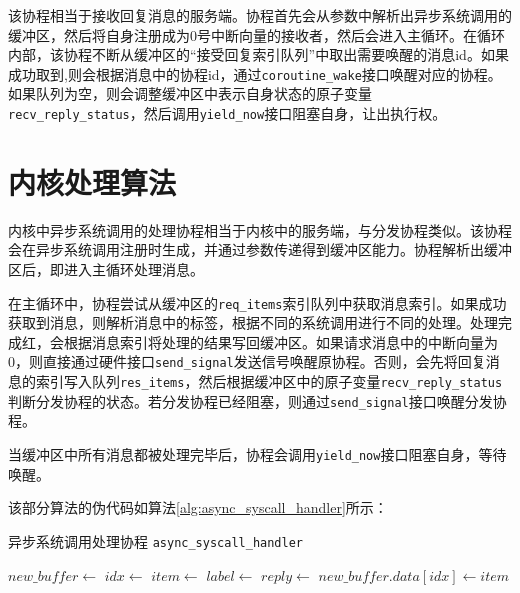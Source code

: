 该协程相当于接收回复消息的服务端。协程首先会从参数中解析出异步系统调用的缓冲区，然后将自身注册成为0号中断向量的接收者，然后会进入主循环。在循环内部，该协程不断从缓冲区的“接受回复索引队列”中取出需要唤醒的消息id。如果成功取到,则会根据消息中的协程id，通过\texttt{coroutine\_wake}接口唤醒对应的协程。如果队列为空，则会调整缓冲区中表示自身状态的原子变量
\texttt{recv\_reply\_status}，然后调用\texttt{yield\_now}接口阻塞自身，让出执行权。

\section{内核处理算法}

内核中异步系统调用的处理协程相当于内核中的服务端，与分发协程类似。该协程会在异步系统调用注册时生成，并通过参数传递得到缓冲区能力。协程解析出缓冲区后，即进入主循环处理消息。

在主循环中，协程尝试从缓冲区的\texttt{req\_items}索引队列中获取消息索引。如果成功获取到消息，则解析消息中的标签，根据不同的系统调用进行不同的处理。处理完成红，会根据消息索引将处理的结果写回缓冲区。如果请求消息中的中断向量为0，则直接通过硬件接口\texttt{send\_signal}发送信号唤醒原协程。否则，会先将回复消息的索引写入队列\texttt{res\_items}，然后根据缓冲区中的原子变量\texttt{recv\_reply\_status}判断分发协程的状态。若分发协程已经阻塞，则通过\texttt{send\_signal}接口唤醒分发协程。

当缓冲区中所有消息都被处理完毕后，协程会调用\texttt{yield\_now}接口阻塞自身，等待唤醒。

该部分算法的伪代码如算法\ref*{alg:async_syscall_handler}所示：

\begin{algorithm}[!h]
  \caption{异步系统调用处理协程 \texttt{async\_syscall\_handler}}\label{alg:async_syscall_handler}
\begin{algorithmic}
    \State $new\_buffer \gets$ 
    \Loop
            \State $idx \gets$ 
            \State $item \gets$ 
            \State $label \gets$ 
            \State {}
            \State $reply \gets$ 
            \State $new\_buffer.data[idx] \gets item$
                \State {}
            \Else
                \State {}
                    \State {}
                    \State {}
                \EndIf
            \EndIf
        \Else
            \State {}
            \State {} 
        \EndIf
    \EndLoop
\EndFunction
\end{algorithmic}
\end{algorithm}



